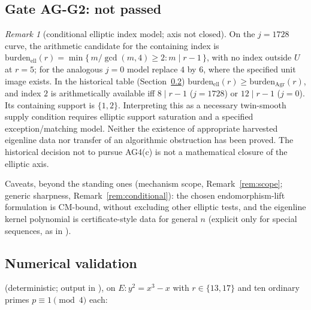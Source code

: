 \documentclass[11pt]{article}
\theoremstyle{remark}
\newtheorem{remark}[theorem]{Remark}
\begin{document}
\subsection{Gate AG-G2: not passed}

\begin{remark}[conditional elliptic index model; axis not closed]\label{cor:ellclosed}
On the $j=1728$ curve, the arithmetic candidate for the containing index is
$\mathrm{burden}_{\mathrm{ell}}(r) = \min\{\, m/\gcd(m,4) \ge 2 : m \mid
r - 1 \,\}$, with no index outside $U$ at $r=5$; for the analogous
$j=0$ model replace $4$ by $6$, where the specified unit image exists.
In the historical table (Section~\ref{sec:ellnumerics})
$\mathrm{burden}_{\mathrm{ell}}(r) \ge \mathrm{burden}_{\mathrm{Agr}}(r)$,
and index $2$ is arithmetically available iff $8\mid r-1$ ($j=1728$)
or $12\mid r-1$ ($j=0$). Its containing support is $\{1,2\}$.
Interpreting this as a necessary twin-smooth supply condition requires
elliptic support saturation and a specified exception/matching model.
Neither the existence of appropriate harvested eigenline data nor transfer
of an algorithmic obstruction has been proved. The historical decision not
to pursue AG4(c) is not a mathematical closure of the elliptic axis.
\end{remark}

Caveats, beyond the standing ones (mechanism scope, Remark~\ref{rem:scope};
generic sharpness, Remark~\ref{rem:conditional}): the chosen endomorphism-lift formulation is
CM-bound, without excluding other elliptic tests, and the eigenline kernel
polynomial is certificate-style data for general $n$ (explicit only for
special sequences, as in \cite{GK12,CouveignesLercier}).

\subsection{Numerical validation}\label{sec:ellnumerics}

 (deterministic; output in
), on $E : y^2 = x^3 - x$
with $r \in \{13, 17\}$ and ten ordinary primes $p \equiv 1 \pmod 4$ each:
\end{document}
